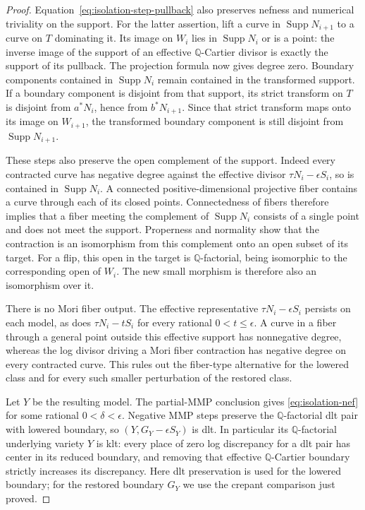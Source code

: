 \begin{proof}
Equation~\eqref{eq:isolation-step-pullback} also preserves nefness and
numerical triviality on the support.  For the latter assertion, lift
a curve in $\operatorname{Supp}N_{i+1}$ to a curve on $T$ dominating
it.  Its image on $W_i$ lies in $\operatorname{Supp}N_i$ or is a point:
the inverse image of the support of an effective $\mathbb Q$-Cartier
divisor is exactly the support of its pullback.  The projection
formula now gives degree zero.  Boundary components contained in
$\operatorname{Supp}N_i$ remain contained in the transformed support.
If a boundary component is disjoint from that support, its strict
transform on $T$ is disjoint from $a^*N_i$, hence from $b^*N_{i+1}$.
Since that strict transform maps onto its image on $W_{i+1}$, the
transformed boundary component is still disjoint from
$\operatorname{Supp}N_{i+1}$.

These steps also preserve the open complement of the support.
Indeed every contracted curve has negative degree against the
effective divisor $\tau N_i-\epsilon S_i$, so is contained in
$\operatorname{Supp}N_i$.  A connected positive-dimensional
projective fiber contains a curve through each of its closed points.
Connectedness of fibers therefore implies that a fiber meeting the complement of
$\operatorname{Supp}N_i$ consists of a single point and does not meet
the support.  Properness and normality show that the contraction is
an isomorphism from this complement onto an open subset of its
target.  For a flip, this open in the target is $\mathbb Q$-factorial,
being isomorphic to the corresponding open of $W_i$.  The new small
morphism is therefore also an isomorphism over it.

There is no Mori fiber output.  The effective representative
$\tau N_i-\epsilon S_i$ persists on each model, as does
$\tau N_i-tS_i$ for every rational $0<t\leq\epsilon$.
A curve in a fiber through a general point outside this effective
support has nonnegative degree, whereas the log divisor driving a
Mori fiber contraction has negative degree on every contracted
curve.  This rules out the fiber-type alternative for the lowered
class and for every such smaller perturbation of the restored class.

Let $Y$ be the resulting model.  The partial-MMP conclusion gives
\eqref{eq:isolation-nef} for some rational $0<\delta<\epsilon$.
Negative MMP
steps preserve the $\mathbb Q$-factorial dlt pair with lowered
boundary, so $(Y,G_Y-\epsilon S_Y)$ is dlt.  In particular its
$\mathbb Q$-factorial underlying variety $Y$ is klt: every place of
zero log discrepancy for a dlt pair has center in its reduced
boundary, and removing that effective $\mathbb Q$-Cartier boundary
strictly increases its discrepancy.  Here dlt
preservation is used for the lowered boundary; for the restored
boundary $G_Y$ we use the crepant comparison just proved.


\end{proof}
